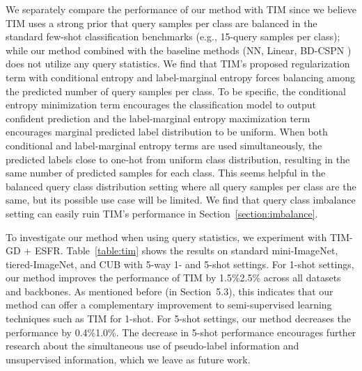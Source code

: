 \documentclass{article}
\begin{document}
We separately compare the performance of our method with TIM \cite{TIM} since we believe TIM uses a strong prior that query samples per class are balanced in the standard few-shot classification benchmarks (e.g., 15-query samples per class); while our method combined with the baseline methods (NN, Linear, BD-CSPN \cite{BDCSPN}) does not utilize any query statistics.
We find that TIM's proposed regularization term with conditional entropy and label-marginal entropy forces balancing among the predicted number of query samples per class.
To be specific, the conditional entropy minimization term encourages the classification model to output confident prediction and the label-marginal entropy maximization term encourages marginal predicted label distribution to be uniform.
When both conditional and label-marginal entropy terms are used simultaneously, the predicted labels close to one-hot from uniform class distribution, resulting in the same number of predicted samples for each class.
This seems helpful in the balanced query class distribution setting where all query samples per class are the same, but its possible use case will be limited.
We find that query class imbalance setting can easily ruin TIM's performance in Section~\ref{section:imbalance}.

To investigate our method when using query statistics, we experiment with TIM-GD + ESFR.
Table~\ref{table:tim} shows the results on standard mini-ImageNet, tiered-ImageNet, and CUB with 5-way 1- and 5-shot settings.
For 1-shot settings, our method improves the performance of TIM by 1.5\%2.5\% across all datasets and backbones.
As mentioned before (in Section~5.3), this indicates that our method can offer a complementary improvement to semi-supervised learning techniques such as TIM for 1-shot.
For 5-shot settings, our method decreases the performance by 0.4\%1.0\%.
The decrease in 5-shot performance encourages further research about the simultaneous use of pseudo-label information and unsupervised information, which we leave as future work.
\end{document}
